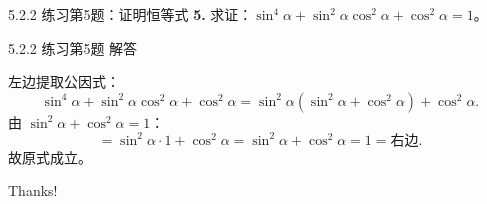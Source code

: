 \documentclass[10pt,aspectratio=169,serif]{beamer}
\begin{document}
\begin{frame}[t]{5.2.2 练习第5题：证明恒等式}
\textbf{5.} 求证：$\sin^4\alpha+\sin^2\alpha\cos^2\alpha+\cos^2\alpha=1$。
\end{frame}

\begin{frame}[t]{5.2.2 练习第5题 解答}
\begin{tcolorbox}[colback=orange!10,colframe=orange,title=\textbf{证明}]
左边提取公因式：
\[
\sin^4\alpha+\sin^2\alpha\cos^2\alpha+\cos^2\alpha
= \sin^2\alpha(\sin^2\alpha+\cos^2\alpha)+\cos^2\alpha.
\]
由 $\sin^2\alpha+\cos^2\alpha=1$：
\[
= \sin^2\alpha\cdot 1 + \cos^2\alpha = \sin^2\alpha+\cos^2\alpha = 1 = \text{右边}.
\]
\vspace{0.3em}
故原式成立。
\end{tcolorbox}
\end{frame}

\begin{frame}[c]
  \begin{center}
    {\Huge\calligra Thanks!}
  \end{center}
\end{frame}
\end{document}
